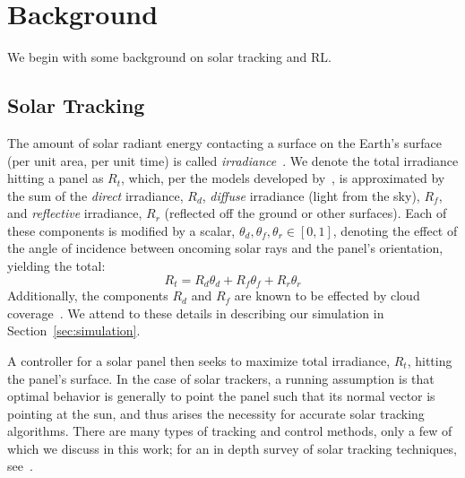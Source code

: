 \documentclass{article}
\begin{document}
\section{Background}

We begin with some background on solar tracking and RL.

\subsection{Solar Tracking}
The amount of solar radiant energy contacting a surface on the Earth's surface (per unit area, per unit time) is called {\it irradiance}~\cite{goswami2000principles}.  We denote the total irradiance hitting a panel as $R_t$, which, per the models developed by~\citet{kamali2006estimating}, is approximated by the sum of the {\it direct} irradiance, $R_d$, {\it diffuse} irradiance (light from the sky), $R_f$, and {\it reflective} irradiance, $R_r$ (reflected off the ground or other surfaces). Each of these components is modified by a scalar, $\theta_d, \theta_f, \theta_r \in [0,1]$, denoting the effect of the angle of incidence between oncoming solar rays and the panel's orientation, yielding the total:
\begin{equation}
R_t = R_d \theta_d + R_f \theta_f + R_r \theta_r
\label{eq:total_rads}
\end{equation}
Additionally, the components $R_d$ and $R_f$ are known to be effected by cloud coverage~\cite{li2004overcast,pfister2003cloud,tzoumanikas2016effect}. We attend to these details in describing our simulation in Section~\ref{sec:simulation}.

A controller for a solar panel then seeks to maximize total irradiance, $R_t$, hitting the panel's surface. In the case of solar trackers, a running assumption is that optimal behavior is generally to point the panel such that its normal vector is pointing at the sun, and thus arises the necessity for accurate solar tracking algorithms. There are many types of tracking and control methods, only a few of which we discuss in this work; for an in depth survey of solar tracking techniques, see~\citet{mousazadeh2009review}.
\end{document}
